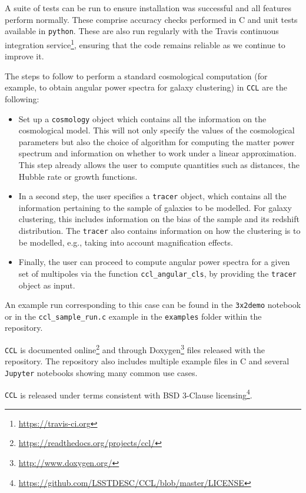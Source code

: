 \documentclass[\docopts]{\docclass}
\newcommand{\ccl}{{\tt CCL}\xspace}
\begin{document}
A suite of tests can be run to ensure installation was successful and all features perform normally. These comprise accuracy checks performed in C and unit tests available in {\tt python}. These are also run regularly with the Travis continuous integration service\footnote{\url{https://travis-ci.org}}, ensuring that the code remains reliable as we continue to improve it. 

The steps to follow to perform a standard cosmological computation (for example, to obtain angular power spectra for galaxy clustering) in \ccl are the following:
\begin{itemize}
\item Set up a {\tt cosmology} object which contains all the information on the cosmological model. This will not only specify the values of the cosmological parameters but also the choice of algorithm for computing the matter power spectrum and information on whether to work under a linear approximation. This step already allows the user to compute quantities such as distances, the Hubble rate or growth functions.
\item In a second step, the user specifies a {\tt tracer} object, which contains all the information pertaining to the sample of galaxies to be modelled. For galaxy clustering, this includes information on the bias of the sample and its redshift distribution. The {\tt tracer} also contains information on how the clustering is to be modelled, e.g., taking into account magnification effects. 
\item Finally, the user can proceed to compute angular power spectra for a given set of multipoles via the function {\tt ccl\_angular\_cls}, by providing the {\tt tracer} object as input.
\end{itemize}
An example run corresponding to this case can be found in the {\tt 3x2demo} notebook or in the {\tt ccl\_sample\_run.c} example in the {\tt examples} folder within the repository.

\ccl is documented online\footnote{\url{https://readthedocs.org/projects/ccl/}} and through Doxygen\footnote{\url{http://www.doxygen.org/}} files released with the repository. The repository also includes multiple example files in C and several {\tt Jupyter} notebooks showing many common use cases.

\ccl is released under terms consistent with BSD 3-Clause licensing\footnote{\url{https://github.com/LSSTDESC/CCL/blob/master/LICENSE}}.

\end{document}
